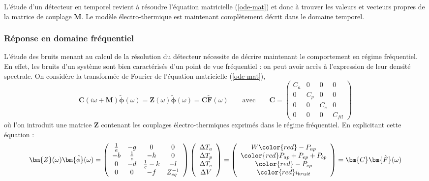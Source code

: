 L'étude d'un détecteur en temporel revient à résoudre l'équation matricielle (\ref{ode-mat}) et donc à trouver les valeurs et vecteurs propres de la matrice de couplage $\bm{M}$. Le modèle électro-thermique est maintenant complètement décrit dans le domaine temporel.

\subsubsection{Réponse en domaine fréquentiel}
\label{omega}

L'étude des bruits menant au calcul de la résolution du détecteur nécessite de décrire maintenant le comportement en régime fréquentiel. En effet, les bruits d'un système sont bien caractérisés d'un point de vue fréquentiel : on peut avoir accès à l'expression de leur densité spectrale.
On considère la transformée de Fourier de l'équation matricielle (\ref{ode-mat}),
\begin{equation}
\bm{C} (i\omega + \bm{M})  \bm{\tilde{\phi}}  (\omega) = \bm{Z} (\omega) \bm{\tilde{\phi}} (\omega)  = \bm{C} \bm{\tilde{F}} (\omega) \qquad \textrm{avec} \qquad \bm{C} = \left( \begin{array}{cccc}
 C_a&0&0&0 \\
0&C_p&0&0\\
0&0&C_e&0\\
0&0&0&C_{fil}
\end{array} \right)
\end{equation}
où l'on introduit une matrice $\bm{Z}$ contenant les couplages électro-thermiques exprimés dans le régime fréquentiel. En explicitant cette équation :
\begin{equation}
\label{z-mat}
\bm{Z} (\omega) \bm{\tilde{\phi}} (\omega) =
\left( \begin{array}{cccc}
 \frac{1}{a}&-g&0&0 \\
-b&\frac{1}{c}&-h&0\\
0&-d&\frac{1}{e}-k&-l\\
0&0&-f&Z_{eq}^{-1}
\end{array} \right)
\left( \begin{array}{c}
\Delta T_a\\
\Delta T_p\\
\Delta T_e\\
\Delta V
\end{array} \right)
 =
\left( \begin{array}{c}
W\begingroup\color{red} - P_{ap}\endgroup\\
\begingroup\color{red}  P_{ap} + P_{ep} + P_{bp}\endgroup\\
\begingroup\color{red} - P_{ep}\endgroup\\
\begingroup\color{red}  i_{bruit} \endgroup
\end{array} \right)
=  \bm{C} \bm{\tilde{F}} (\omega)
\end{equation}
